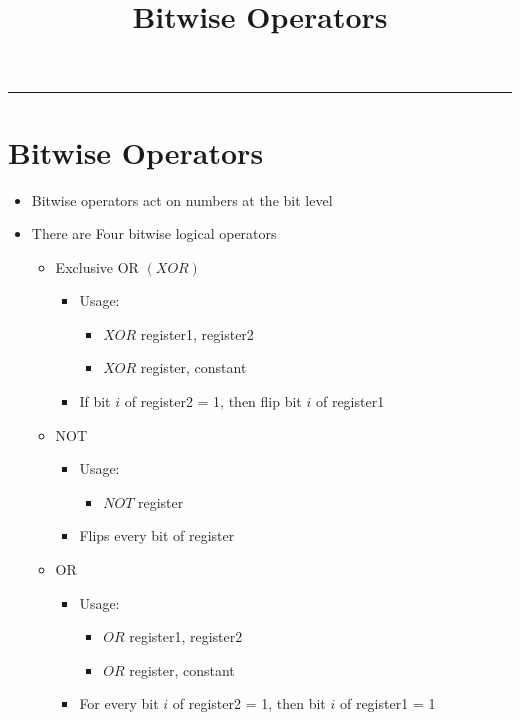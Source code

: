 \documentclass{article}
\title{Bitwise Operators}
\begin{document}
\maketitle

\begin{center}
  \rule{0.5\textwidth}{0.4pt}
\end{center}

\section{Bitwise Operators}
\begin{itemize}
  \item{Bitwise operators act on numbers at the bit level}
  \item{There are Four bitwise logical operators}
  \begin{itemize}
    \item{Exclusive OR $(XOR)$}
    \begin{itemize}
      \item{Usage:}
      \begin{itemize}
        \item{$XOR$ register1, register2}
        \item{$XOR$ register, constant}
      \end{itemize}
      \item{If bit $i$ of register2 = 1, then flip bit $i$ of register1}
    \end{itemize}
    \item{NOT}
    \begin{itemize}
      \item{Usage:}
      \begin{itemize}
        \item{$NOT$ register}
      \end{itemize}
      \item{Flips every bit of register}
    \end{itemize}
    \item{OR}
    \begin{itemize}
      \item{Usage:}
      \begin{itemize}
        \item{$OR$ register1, register2}
        \item{$OR$ register, constant}
      \end{itemize}
      \item{For every bit $i$ of register2 = 1, then bit $i$ of register1 = 1}

\end{itemize}
\end{itemize}
\end{itemize}
\end{document}
